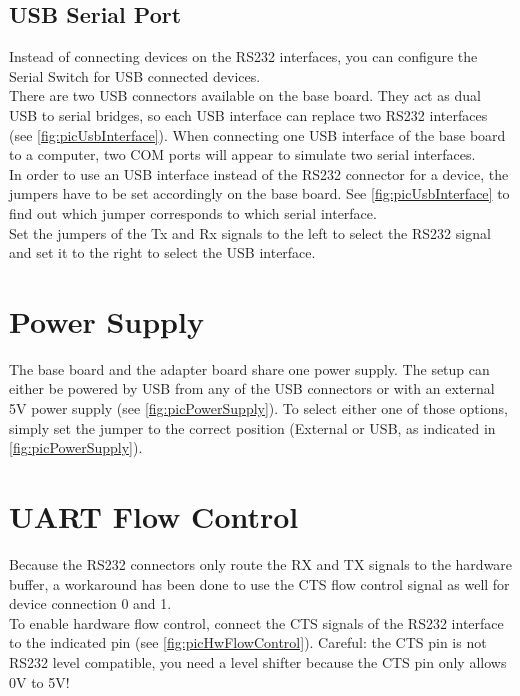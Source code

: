 \subsection{USB Serial Port}
%
Instead of connecting devices on the RS232 interfaces, you can configure the Serial Switch for USB connected devices.\\
There are two USB connectors available on the base board. They act as dual USB to serial bridges, so each USB interface can replace two RS232 interfaces (see \autoref{fig:picUsbInterface}). When connecting one USB interface of the base board to a computer, two COM ports will appear to simulate two serial interfaces.\\
In order to use an USB interface instead of the RS232 connector for a device, the jumpers have to be set accordingly on the base board. See \autoref{fig:picUsbInterface} to find out which jumper corresponds to which serial interface. \\
Set the jumpers of the Tx and Rx signals to the left to select the RS232 signal and set it to the right to select the USB interface.\\
%
%
\section{Power Supply}
%
The base board and the adapter board share one power supply. The setup can either be powered by USB from any of the USB connectors or with an external 5V power supply (see \autoref{fig:picPowerSupply}). To select either one of those options, simply set the jumper to the correct position (External or USB, as indicated in  \autoref{fig:picPowerSupply}).
%
%
\section{UART Flow Control}
%
Because the RS232 connectors only route the RX and TX signals to the hardware buffer, a workaround has been done to use the CTS flow control signal as well for device connection 0 and 1.\\
To enable hardware flow control, connect the CTS signals of the RS232 interface to the indicated pin (see \autoref{fig:picHwFlowControl}). Careful: the CTS pin is not RS232 level compatible, you need a level shifter because the CTS pin only allows 0V to 5V!
%
%